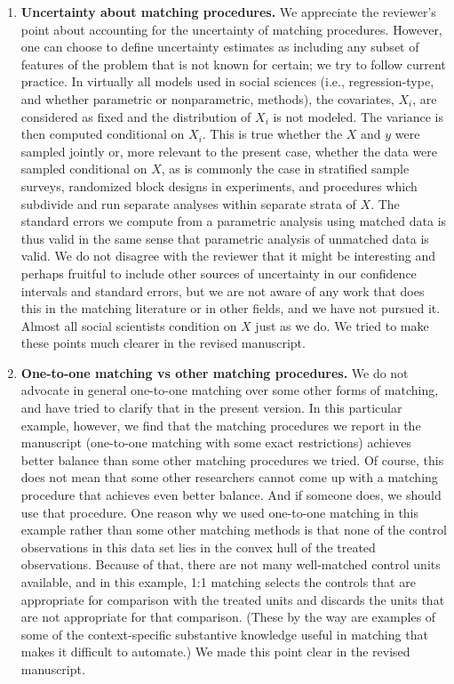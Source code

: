 \documentclass[11pt]{article}
\begin{document}
\begin{enumerate}
\item {\bf Uncertainty about matching procedures.} We appreciate the
  reviewer's point about accounting for the uncertainty of matching
  procedures.  However, one can choose to define uncertainty estimates
  as including any subset of features of the problem that is not known
  for certain; we try to follow current practice.  In virtually all
  models used in social sciences (i.e., regression-type, and whether
  parametric or nonparametric, methods), the covariates, $X_i$, are
  considered as fixed and the distribution of $X_i$ is not modeled.
  The variance is then computed conditional on $X_i$.  This is true
  whether the $X$ and $y$ were sampled jointly or, more relevant to
  the present case, whether the data were sampled conditional on $X$,
  as is commonly the case in stratified sample surveys, randomized
  block designs in experiments, and procedures which subdivide and run
  separate analyses within separate strata of $X$.  The standard
  errors we compute from a parametric analysis using matched data is
  thus valid in the same sense that parametric analysis of unmatched
  data is valid.  We do not disagree with the reviewer that it might
  be interesting and perhaps fruitful to include other sources of
  uncertainty in our confidence intervals and standard errors, but we
  are not aware of any work that does this in the matching literature
  or in other fields, and we have not pursued it.  Almost all social
  scientists condition on $X$ just as we do.  We tried to make these
  points much clearer in the revised manuscript.
  
\item {\bf One-to-one matching vs other matching procedures.} We do
  not advocate in general one-to-one matching over some other forms of
  matching, and have tried to clarify that in the present version. In
  this particular example, however, we find that the matching
  procedures we report in the manuscript (one-to-one matching with
  some exact restrictions) achieves better balance than some other
  matching procedures we tried. Of course, this does not mean that
  some other researchers cannot come up with a matching procedure that
  achieves even better balance. And if someone does, we should use
  that procedure. One reason why we used one-to-one matching in this
  example rather than some other matching methods is that none of the
  control observations in this data set lies in the convex hull of the
  treated observations.
  Because of that, there are not many well-matched control units available,  
  and in this example, 1:1 matching selects the controls that are
  appropriate for comparison with the treated units and discards the units that
  are not appropriate for that comparison. 
  (These by the way are examples of some of
  the context-specific substantive knowledge useful in matching that
  makes it difficult to automate.) We made this point clear in the
  revised manuscript.
  

\end{enumerate}
\end{document}
